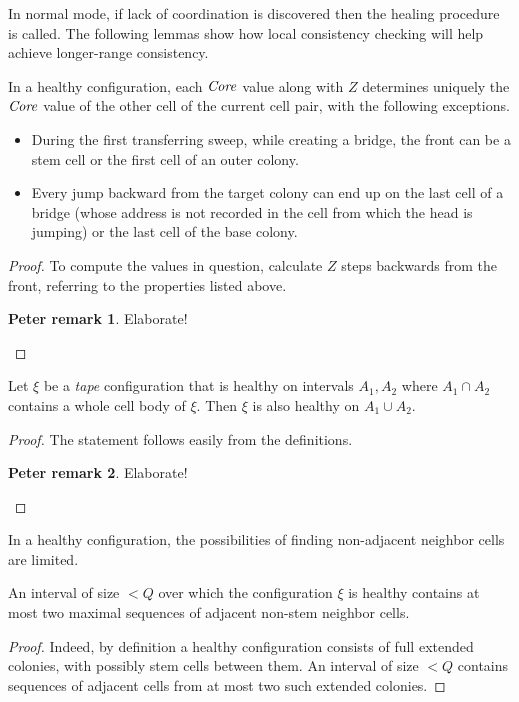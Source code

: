 \documentclass[11pt]{memoir}
\newcommand{\authnote}[3]
{\text{{ \textcolor{#3}{\( \langle\hspace{-0.2em}\langle \)\textsf{\footnotesize #1: #2}\( \rangle\hspace{-0.2em}\rangle \)}}}}
\newcommand{\authnote}[2]{}
\newcommand{\Pnote}[1]{{\authnote{P}{#1}{cyan}}}
\theoremstyle{definition} %
\newtheorem{Premark}{\color{cyan}Peter remark}
\newenvironment{premark}{\begin{Premark}\color{cyan}}{\varqed\end{Premark}}
\renewcommand{\Pnote}[1]{\begin{premark}#1\end{premark}}
\newcommand{\fld}[1]{\ensuremath{\textit{#1\/}}}
\newcommand{\Q}{Q}
\newcommand{\Z}{Z}
\newcommand{\Core}{\fld{Core}}
\begin{document}
In normal mode, if lack of coordination is discovered then the healing procedure is called.
The following lemmas show 
how local consistency checking will help achieve longer-range consistency.

\begin{lemma}\label{lem:coordination1}
  In a healthy configuration, each \( \Core \) 
  value along with \( \Z \) determines uniquely the 
  \( \Core \) value of the other cell of the current cell pair, with the following exceptions.
  \begin{itemize}
  \item During the first transferring sweep, while
    creating a bridge, the front can be a stem cell or the first cell of an outer colony.
  \item Every jump backward from the target colony can end up on the last cell of a 
    bridge (whose address is not recorded in the cell from which the head is jumping)
    or the last cell of the base colony.
  \end{itemize}
  \end{lemma}
  \begin{proof}
  To compute the values in question, calculate \( \Z \) steps backwards from the front,
  referring to the properties listed above.
\Pnote{Elaborate!}    
  \end{proof}

\begin{lemma}\label{lem:health-extension}
  Let \( \xi \) be a \emph{tape} configuration that is healthy on intervals \( A_{1}, A_{2} \) 
where \( A_{1}\cap A_{2} \) contains a whole cell body of \( \xi \).
Then \( \xi \) is also healthy on \( A_{1}\cup A_{2} \).
\end{lemma}
\begin{proof}
  The statement follows easily from the definitions.
\Pnote{Elaborate!}    
\end{proof}

In a healthy configuration, the possibilities of finding non-adjacent neighbor
cells are limited.

\begin{lemma}\label{lem:two-domains}
  An interval of size \( <\Q \) over which the configuration \( \xi \) is healthy
contains at most two maximal sequences of adjacent non-stem neighbor cells.
\end{lemma}
\begin{proof}
Indeed, by definition a healthy configuration consists of full extended colonies, with 
possibly stem cells between them.
An interval of size \( <\Q \) contains sequences of adjacent cells 
from at most two such extended colonies.
\end{proof}
\end{document}
